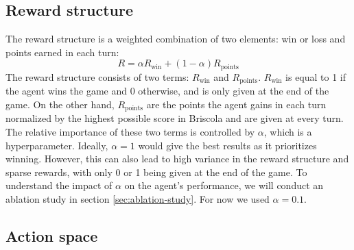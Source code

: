 \subsection{Reward structure}
The reward structure is a weighted combination of two elements: win or loss and points earned in each turn:
\begin{equation}
    R = \alpha R_\textrm{win} + (1 - \alpha) R_\textrm{points}
    \label{eq:reward-structure}
\end{equation}
The reward structure consists of two terms: $R_\textrm{win}$ and $R_\textrm{points}$. $R_\textrm{win}$ is equal to 1 if the agent wins the game and 0 otherwise, and is only given at the end of the game. On the other hand, $R_\textrm{points}$ are the points the agent gains in each turn normalized by the highest possible score in Briscola and are given at every turn. The relative importance of these two terms is controlled by $\alpha$, which is a hyperparameter. Ideally, $\alpha=1$ would give the best results as it prioritizes winning. However, this can also lead to high variance in the reward structure and sparse rewards, with only 0 or 1 being given at the end of the game. To understand the impact of $\alpha$ on the agent's performance, we will conduct an ablation study in section \ref{sec:ablation-study}. For now we used $\alpha=0.1$.
\subsection{Action space}

